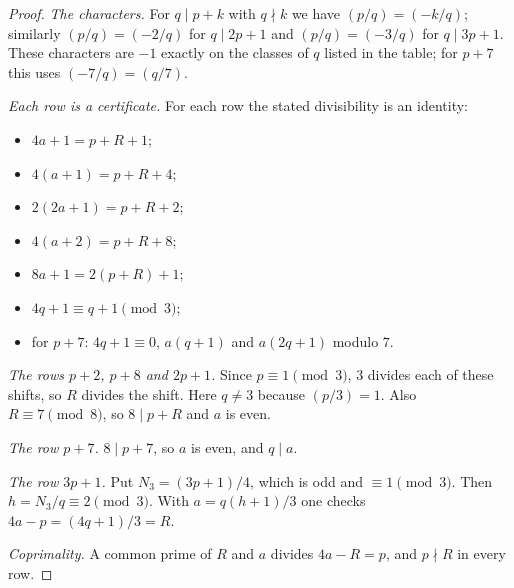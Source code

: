 \begin{proof}
\emph{The characters.} For $q\mid p+k$ with $q\nmid k$ we have $(p/q)=(-k/q)$; similarly $(p/q)=(-2/q)$ for $q\mid 2p+1$ and $(p/q)=(-3/q)$ for $q\mid3p+1$. These characters are $-1$ exactly on the classes of $q$ listed in the table; for $p+7$ this uses $(-7/q)=(q/7)$.

\emph{Each row is a certificate.} For each row the stated divisibility is an identity:
\begin{itemize}
\item $4a+1=p+R+1$;
\item $4(a+1)=p+R+4$;
\item $2(2a+1)=p+R+2$;
\item $4(a+2)=p+R+8$;
\item $8a+1=2(p+R)+1$;
\item $4q+1\equiv q+1\pmod3$;
\item for $p+7$: $4q+1\equiv0$, $a(q+1)$ and $a(2q+1)$ modulo $7$.
\end{itemize}

\emph{The rows $p+2$, $p+8$ and $2p+1$.} Since $p\equiv1\pmod3$, $3$ divides each of these shifts, so $R$ divides the shift. Here $q\neq3$ because $(p/3)=1$. Also $R\equiv7\pmod8$, so $8\mid p+R$ and $a$ is even.

\emph{The row $p+7$.} $8\mid p+7$, so $a$ is even, and $q\mid a$.

\emph{The row $3p+1$.} Put $N_3=(3p+1)/4$, which is odd and $\equiv1\pmod3$. Then $h=N_3/q\equiv2\pmod3$. With $a=q(h+1)/3$ one checks $4a-p=(4q+1)/3=R$.

\emph{Coprimality.} A common prime of $R$ and $a$ divides $4a-R=p$, and $p\nmid R$ in every row.
\end{proof}


